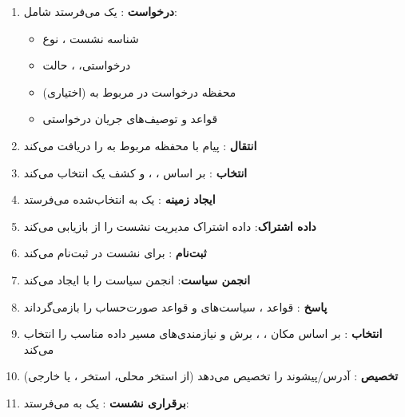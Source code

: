 \begin{enumerate}
\def\labelenumi{\arabic{enumi}.}
\tightlist
\item
  \textbf{درخواست }:  یک  می‌فرستد شامل:

  \begin{itemize}
  \tightlist
  \item
    شناسه نشست ، نوع 
  \item
     درخواستی، ، حالت 
  \item
    محفظه درخواست  در  مربوط به  (اختیاری)
  \item
    قواعد  و توصیف‌های جریان  درخواستی
  \end{itemize}
\item
  \textbf{انتقال }:  پیام  با محفظه  مربوط به  را دریافت می‌کند
\item
  \textbf{انتخاب }:  بر اساس ، ،  و کشف  یک  انتخاب می‌کند
\item
  \textbf{ایجاد زمینه }:  یک  به  انتخاب‌شده می‌فرستد
\item
  \textbf{داده اشتراک}:  داده اشتراک مدیریت نشست را از  بازیابی می‌کند 
\item
  \textbf{ثبت‌نام }:  برای نشست  در  ثبت‌نام می‌کند
\item
  \textbf{انجمن سیاست}:  انجمن سیاست  را با  ایجاد می‌کند 
\item
  \textbf{پاسخ }:  قواعد ، سیاست‌های  و قواعد صورت‌حساب را بازمی‌گرداند
\item
  \textbf{انتخاب }:  بر اساس مکان ، ، برش و نیازمندی‌های مسیر داده  مناسب را انتخاب می‌کند
\item
  \textbf{تخصیص }:  آدرس/\allowbreak{}پیشوند  را تخصیص می‌دهد (از استخر محلی، استخر ، یا  خارجی)
\item
  \textbf{برقراری نشست }:  یک  به  می‌فرستد:


\end{enumerate}
